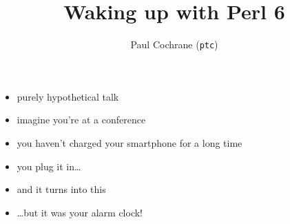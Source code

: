 \documentclass[c]{beamer}
\title{Waking up with Perl 6}
\author{Paul Cochrane (\texttt{ptc})}
\institute{%
\url{http://codeaffe.de}\\
\url{https://github.com/paultcochrane/talks/waking-up-with-perl6}
}
\begin{document}
\begin{frame}
    \titlepage{}
\end{frame}

\begin{frame}
    \begin{itemize}
        \item purely hypothetical talk
            \pause{}
        \item imagine you're at a conference
            \pause{}
        \item you haven't charged your smartphone for a long time
    \end{itemize}
\end{frame}

\begin{frame}
    \begin{itemize}
        \item you plug it in\ldots
            \pause{}
        \item and it turns into this
    \end{itemize}
\end{frame}

\begin{frame}
    \begin{itemize}
        \item \ldots but it was your alarm clock!
    \end{itemize}
\end{frame}
\end{document}
